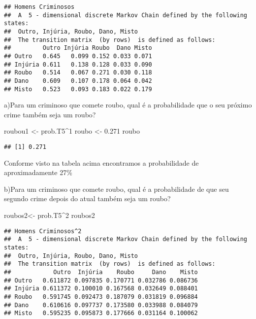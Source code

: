 \documentclass[
]{article}
\newenvironment{Shaded}{\begin{snugshade}}{\end{snugshade}}
\newcommand{\DecValTok}[1]{\textcolor[rgb]{0.00,0.00,0.81}{#1}}
\newcommand{\FloatTok}[1]{\textcolor[rgb]{0.00,0.00,0.81}{#1}}
\newcommand{\NormalTok}[1]{#1}
\newcommand{\OperatorTok}[1]{\textcolor[rgb]{0.81,0.36,0.00}{\textbf{#1}}}
\newcommand{\StringTok}[1]{\textcolor[rgb]{0.31,0.60,0.02}{#1}}
\begin{document}
\begin{verbatim}
## Homens Criminosos 
##  A  5 - dimensional discrete Markov Chain defined by the following states: 
##  Outro, Injúria, Roubo, Dano, Misto 
##  The transition matrix  (by rows)  is defined as follows: 
##         Outro Injúria Roubo  Dano Misto
## Outro   0.645   0.099 0.152 0.033 0.071
## Injúria 0.611   0.138 0.128 0.033 0.090
## Roubo   0.514   0.067 0.271 0.030 0.118
## Dano    0.609   0.107 0.178 0.064 0.042
## Misto   0.523   0.093 0.183 0.022 0.179
\end{verbatim}

a)Para um criminoso que comete roubo, qual é a probabilidade que o seu
próximo crime também seja um roubo?

\begin{Shaded}
\begin{Highlighting}[]
\NormalTok{roubou1 <-}\StringTok{ }\NormalTok{prob.T5}\OperatorTok{^}\DecValTok{1}
\NormalTok{roubo <-}\StringTok{ }\FloatTok{0.271}
\NormalTok{roubo}
\end{Highlighting}
\end{Shaded}

\begin{verbatim}
## [1] 0.271
\end{verbatim}

Conforme visto na tabela acima encontramos a probabilidade de
aproximadamente 27\%

b)Para um criminoso que comete roubo, qual é a probabilidade de que seu
segundo crime depois do atual também seja um roubo?

\begin{Shaded}
\begin{Highlighting}[]
\NormalTok{roubos2<-}\StringTok{ }\NormalTok{prob.T5}\OperatorTok{^}\DecValTok{2}
\NormalTok{roubos2}
\end{Highlighting}
\end{Shaded}

\begin{verbatim}
## Homens Criminosos^2 
##  A  5 - dimensional discrete Markov Chain defined by the following states: 
##  Outro, Injúria, Roubo, Dano, Misto 
##  The transition matrix  (by rows)  is defined as follows: 
##            Outro  Injúria    Roubo     Dano    Misto
## Outro   0.611872 0.097835 0.170771 0.032786 0.086736
## Injúria 0.611372 0.100010 0.167568 0.032649 0.088401
## Roubo   0.591745 0.092473 0.187079 0.031819 0.096884
## Dano    0.610616 0.097737 0.173580 0.033988 0.084079
## Misto   0.595235 0.095873 0.177666 0.031164 0.100062
\end{verbatim}
\end{document}
